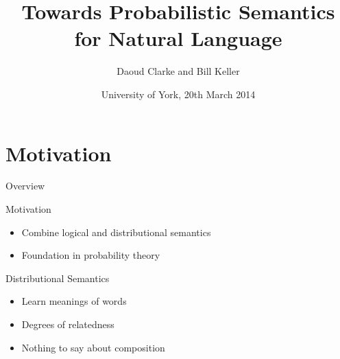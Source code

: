 \documentclass{beamer}
\title%
{Towards Probabilistic Semantics for Natural Language}
\author[Department of Informatics, University of Sussex] %
{Daoud Clarke and Bill Keller}
\institute[University of Sussex] %
{
  Department of Informatics\\
  University of Sussex}
\date[University of York] %
{University of York, 20th March 2014}
\newlength{\wideitemsep}
\let\olditem\item
\renewcommand{\item}{\setlength{\itemsep}{\wideitemsep}\olditem}
\begin{document}
\begin{frame}
  \titlepage
\end{frame}

\section{Motivation}

\begin{frame}{Overview}
  \tableofcontents
\end{frame}






\begin{frame}{Motivation}
\begin{itemize}
\item Combine logical and distributional semantics
\item Foundation in probability theory
\end{itemize}
\end{frame}

\begin{frame}{Distributional Semantics}
\begin{itemize}
\item Learn meanings of words
\item Degrees of relatedness
\item Nothing to say about composition
\end{itemize}
\end{frame}
\end{document}
